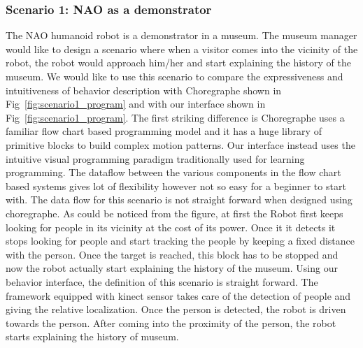 \documentclass{llncs}
\begin{document}
\subsubsection{Scenario 1: NAO as a demonstrator}%
The NAO humanoid robot is a demonstrator in a museum. The museum manager would like to design a scenario where when a visitor comes into the vicinity of the robot, the robot would approach him/her and start explaining the history of the museum. We would like to use this scenario to compare the expressiveness and intuitiveness of behavior description with Choregraphe \cite{Choregraphe} shown in Fig~\ref{fig:scenario1_program} and with our interface shown in Fig~\ref{fig:scenario1_program}. The first striking difference is Choregraphe uses a familiar flow chart based programming model and it has a huge library of primitive blocks to build complex motion patterns. Our interface instead uses the intuitive visual programming paradigm traditionally used for learning programming. The dataflow between the various components in the flow chart based systems gives lot of flexibility however not so easy for a beginner to start with. 
	The data flow for this scenario is not straight forward when designed using choregraphe. As could be noticed from the figure, at first the Robot first keeps looking for people in its vicinity at the cost of its power. Once it it detects it stops looking for people and start tracking the people by keeping a fixed distance with the person. Once the target is reached, this block has to be stopped and now the robot actually start explaining the history of the museum.
	Using our behavior interface, the definition of this scenario is straight forward. The framework equipped with kinect sensor takes care of the detection of people and giving the relative localization. Once the person is detected, the robot is driven towards the person. After coming into the proximity of the person, the robot starts explaining the history of museum.
%                                          
\end{document}
